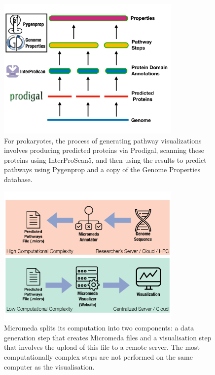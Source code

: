 \begin{figure}[!ht]
  \centering
	\includegraphics[width=0.8\textwidth]{media/micromeda-pipeline.pdf}
	 \caption{For prokaryotes, the process of generating pathway visualizations involves producing predicted proteins via Prodigal, scanning these proteins using InterProScan5, and then using the results to predict pathways using Pygenprop and a copy of the Genome Properties database.}
	 \label{fig:micromeda-levels}
\end{figure}

\begin{figure}[!ht]
  \centering
	\includegraphics[width=0.8\textwidth]{media/micromeda-file-generation.pdf}
	 \caption{Micromeda splits its computation into two components: a data generation step that creates Micromeda files and a visualisation step that involves the upload of this file to a remote server. The most computationally complex steps are not performed on the same computer as the visualisation.}
	 \label{fig:micromeda-file-generation}
\end{figure}

